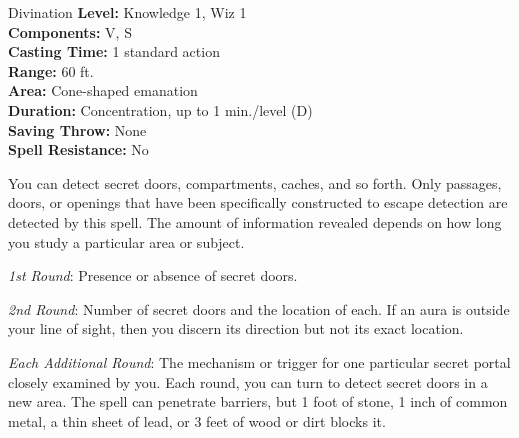{Divination}
{
	\textbf{Level:}
	Knowledge 1, Wiz 1\\
	\textbf{Components:}
	V, S\\
	\textbf{Casting Time:}
	1 standard action\\
	\textbf{Range:}
	60 ft.\\
	\textbf{Area:}
	Cone-shaped emanation\\
	\textbf{Duration:}
	Concentration, up to 1 min./level (D)\\
	\textbf{Saving Throw:}
	None\\
	\textbf{Spell Resistance:}
	No\\
}
{
	You can detect secret doors, compartments, caches, and so forth. Only passages, doors, or openings that have been specifically constructed to escape detection are detected by this spell. The amount of information revealed depends on how long you study a particular area or subject.

	\textit{1st Round}:
	Presence or absence of secret doors.

	\textit{2nd Round}:
	Number of secret doors and the location of each. If an aura is outside your line of sight, then you discern its direction but not its exact location.

	\textit{Each Additional Round}:
	The mechanism or trigger for one particular secret portal closely examined by you. Each round, you can turn to detect secret doors in a new area. The spell can penetrate barriers, but 1 foot of stone, 1 inch of common metal, a thin sheet of lead, or 3 feet of wood or dirt blocks it.

}
